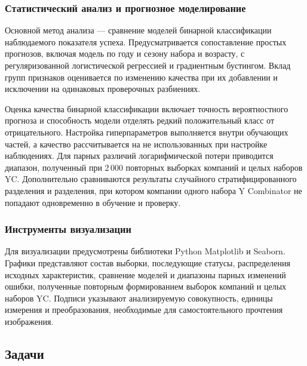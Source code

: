 \subsubsection{Статистический анализ и прогнозное моделирование}

Основной метод анализа --- сравнение моделей бинарной классификации наблюдаемого показателя успеха. Предусматривается сопоставление простых прогнозов, включая модель по году и сезону набора и возрасту, с регуляризованной логистической регрессией и градиентным бустингом. Вклад групп признаков оценивается по изменению качества при их добавлении и исключении на одинаковых проверочных разбиениях.

Оценка качества бинарной классификации включает точность вероятностного прогноза и способность модели отделять редкий положительный класс от отрицательного. Настройка гиперпараметров выполняется внутри обучающих частей, а качество рассчитывается на не использованных при настройке наблюдениях. Для парных различий логарифмической потери приводится диапазон, полученный при 2\,000 повторных выборках компаний и целых наборов YC. Дополнительно сравниваются результаты случайного стратифицированного разделения и разделения, при котором компании одного набора Y Combinator не попадают одновременно в обучение и проверку.

\subsubsection{Инструменты визуализации}

Для визуализации предусмотрены библиотеки Python Matplotlib и Seaborn. Графики представляют состав выборки, последующие статусы, распределения исходных характеристик, сравнение моделей и диапазоны парных изменений ошибки, полученные повторным формированием выборок компаний и целых наборов YC. Подписи указывают анализируемую совокупность, единицы измерения и преобразования, необходимые для самостоятельного прочтения изображения.

\subsection{Задачи}

